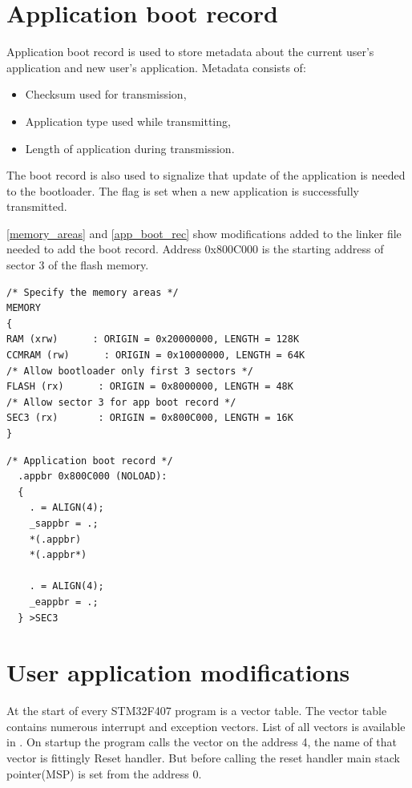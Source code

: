 \section{Application boot record}
\label{boot_record}

Application boot record is used to store metadata about the current user's application and new user's application. Metadata consists of: 
\begin{itemize}
    \item Checksum used for transmission,
    \item Application type used while transmitting,
    \item Length of application during transmission.
\end{itemize}
The boot record is also used to signalize that update of the application is needed to the bootloader. The flag is set when a new application is successfully transmitted.

\autoref{memory_areas} and \autoref{app_boot_rec} show modifications added to the linker file needed to add the boot record. Address 0x800C000 is the starting address of sector 3 of the flash memory.

\begin{lstlisting}[frame=single, label={memory_areas}, caption={Memory areas from the linker file.}, captionpos=b]
/* Specify the memory areas */
MEMORY
{
RAM (xrw)      : ORIGIN = 0x20000000, LENGTH = 128K
CCMRAM (rw)      : ORIGIN = 0x10000000, LENGTH = 64K
/* Allow bootloader only first 3 sectors */
FLASH (rx)      : ORIGIN = 0x8000000, LENGTH = 48K 
/* Allow sector 3 for app boot record */
SEC3 (rx)		: ORIGIN = 0x800C000, LENGTH = 16K
}
\end{lstlisting}

\begin{lstlisting}[frame=single, label={app_boot_rec}, caption={Application boot record from the linker file.}, captionpos=b]
  /* Application boot record */
  .appbr 0x800C000 (NOLOAD):
  {
    . = ALIGN(4);
    _sappbr = .;       
    *(.appbr)
    *(.appbr*)
    
    . = ALIGN(4);
    _eappbr = .;   
  } >SEC3
\end{lstlisting}


\section{User application modifications}

At the start of every STM32F407 program is a vector table. The vector table contains numerous interrupt and exception vectors. List of all vectors is available in \citep[p.~372]{stm32f407_ref_man}. On startup the program calls the vector on the address 4, the name of that vector is fittingly Reset handler. But before calling the reset handler main stack pointer(MSP) is set from the address 0. 

